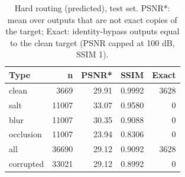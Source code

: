 \begin{table}[t]
\centering
\caption{Hard routing (predicted), test set. PSNR*: mean over outputs that are not exact copies of the target; Exact: identity-bypass outputs equal to the clean target (PSNR capped at 100 dB, SSIM 1).}
\label{tab:t2_routing_predicted_by_type}
\begin{tabular}{lrrrr}
\toprule
Type & n & PSNR* & SSIM & Exact \\
\midrule
clean & 3669 & 29.91 & 0.9992 & 3628 \\
salt & 11007 & 33.07 & 0.9580 & 0 \\
blur & 11007 & 30.35 & 0.9088 & 0 \\
occlusion & 11007 & 23.94 & 0.8306 & 0 \\
all & 36690 & 29.12 & 0.9092 & 3628 \\
corrupted & 33021 & 29.12 & 0.8992 & 0 \\
\bottomrule
\end{tabular}
\end{table}
